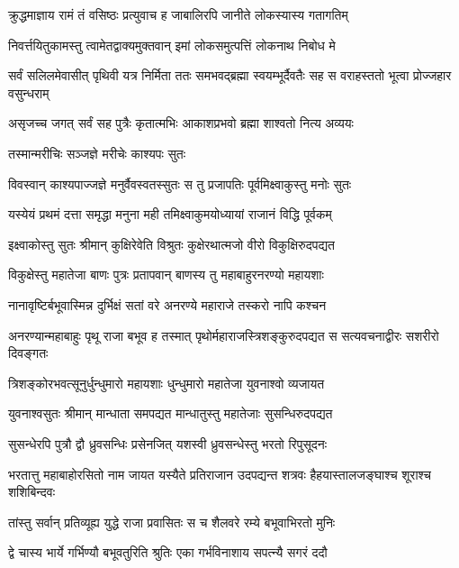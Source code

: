 
\twolineshloka
{क्रुद्धमाज्ञाय रामं तं वसिष्ठः प्रत्युवाच ह}
{जाबालिरपि जानीते लोकस्यास्य गतागतिम्} %

\twolineshloka
{निवर्त्तयितुकामस्तु त्वामेतद्वाक्यमुक्तवान्}
{इमां लोकसमुत्पत्तिं लोकनाथ निबोध मे} %

\threelineshloka
{सर्वं सलिलमेवासीत् पृथिवी यत्र निर्मिता}
{ततः समभवद्ब्रह्मा स्वयम्भूर्दैवतैः सह}
{स वराहस्ततो भूत्वा प्रोज्जहार वसुन्धराम्} %

\twolineshloka
{असृजच्च जगत् सर्वं सह पुत्रैः कृतात्मभिः}
{आकाशप्रभवो ब्रह्मा शाश्वतो नित्य अव्ययः} %

\onelineshloka
{तस्मान्मरीचिः सञ्जज्ञे मरीचेः काश्यपः सुतः} %

\twolineshloka
{विवस्वान् काश्यपाज्जज्ञे मनुर्वैवस्वतस्सुतः}
{स तु प्रजापतिः पूर्वमिक्ष्वाकुस्तु मनोः सुतः} %

\twolineshloka
{यस्येयं प्रथमं दत्ता समृद्धा मनुना मही}
{तमिक्ष्वाकुमयोध्यायां राजानं विद्धि पूर्वकम्} %

\twolineshloka
{इक्ष्वाकोस्तु सुतः श्रीमान् कुक्षिरेवेति विश्रुतः}
{कुक्षेरथात्मजो वीरो विकुक्षिरुदपद्यत} %

\twolineshloka
{विकुक्षेस्तु महातेजा बाणः पुत्रः प्रतापवान्}
{बाणस्य तु महाबाहुरनरण्यो महायशाः} %

\twolineshloka
{नानावृष्टिर्बभूवास्मिन्न दुर्भिक्षं सतां वरे}
{अनरण्ये महाराजे तस्करो नापि कश्चन} %

\threelineshloka
{अनरण्यान्महाबाहुः पृथू राजा बभूव ह}
{तस्मात् पृथोर्महाराजस्त्रिशङ्कुरुदपद्यत}
{स सत्यवचनाद्वीरः सशरीरो दिवङ्गतः} %

\twolineshloka
{त्रिशङ्कोरभवत्सूनुर्धुन्धुमारो महायशाः}
{धुन्धुमारो महातेजा युवनाश्वो व्यजायत} %

\twolineshloka
{युवनाश्वसुतः श्रीमान् मान्धाता समपद्यत}
{मान्धातुस्तु महातेजाः सुसन्धिरुदपद्यत} %

\twolineshloka
{सुसन्धेरपि पुत्रौ द्वौ ध्रुवसन्धिः प्रसेनजित्}
{यशस्वी ध्रुवसन्धेस्तु भरतो रिपुसूदनः} %

\threelineshloka
{भरतात्तु महाबाहोरसितो नाम जायत}
{यस्यैते प्रतिराजान उदपद्यन्त शत्रवः}
{हैहयास्तालजङ्घाश्च शूराश्च शशिबिन्दवः} %

\twolineshloka
{तांस्तु सर्वान् प्रतिव्यूह्य युद्धे राजा प्रवासितः}
{स च शैलवरे रम्ये बभूवाभिरतो मुनिः} %

\twolineshloka
{द्वे चास्य भार्ये गर्भिण्यौ बभूवतुरिति श्रुतिः}
{एका गर्भविनाशाय सपत्न्यै सगरं ददौ} %

